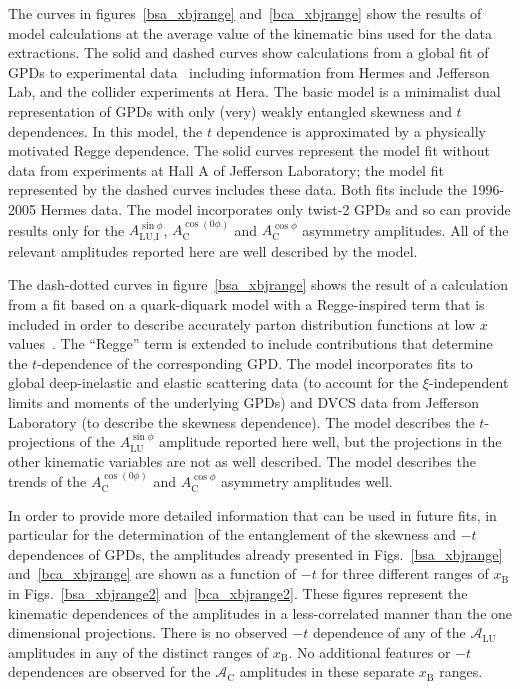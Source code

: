 The curves in  figures~\ref{bsa_xbjrange} and~\ref{bca_xbjrange} show the results of model calculations at the average value of the kinematic bins used for the data extractions. The solid and dashed curves show calculations from a global fit of GPDs to experimental data~\cite{Kum09} including information from H{\sc ermes} and Jefferson Lab, and the collider experiments at H{\sc era}. The basic model is a minimalist dual representation of GPDs with only (very) weakly entangled skewness and $t$ dependences. In this model, the $t$ dependence is approximated by a physically motivated Regge dependence. The solid curves represent the model fit without data from experiments \cite{Cam06, Gir08} at Hall A of Jefferson Laboratory; the model fit represented by the dashed curves includes these data. Both fits include the 1996-2005 H{\sc ermes} data. The model incorporates only twist-2 GPDs and so can provide results only for the $A_{\textrm{LU,I}}^{\sin\phi}$, $A_{\textrm{C}}^{\cos(0\phi)}$ and $A_{\textrm{C}}^{\cos\phi}$ asymmetry amplitudes. All of the relevant amplitudes reported here are well described by the model.

The dash-dotted curves in figure~\ref{bsa_xbjrange} shows the result of a calculation from a fit based on a quark-diquark model with a Regge-inspired term that is included in order to describe accurately parton distribution functions at low $x$ values~\cite{Liu11}. The ``Regge'' term is extended to include contributions that determine the $t$-dependence of the corresponding GPD. The model incorporates fits to global deep-inelastic and elastic scattering data (to account for the $\xi$-independent limits and moments of the underlying GPDs) and DVCS data from Jefferson Laboratory (to describe the skewness dependence). The model describes the $t$-projections of the $A^{\sin\phi}_{\textrm{LU}}$ amplitude reported here well, but the projections in the other kinematic variables are not as well described. The model describes the trends of the $A_{\textrm{C}}^{\cos(0\phi)}$ and $A_{\textrm{C}}^{\cos\phi}$ asymmetry amplitudes well.

In order to provide more detailed information that can be used in future fits, in particular for the determination of the entanglement of the skewness and $-t$ dependences of GPDs, the amplitudes already presented in Figs.~\ref{bsa_xbjrange} and~\ref{bca_xbjrange} are shown as a function of $-t$ for three different ranges of $x_{\textrm{B}}$ in Figs.~\ref{bsa_xbjrange2} and~\ref{bca_xbjrange2}. These figures represent the kinematic dependences of the amplitudes in a less-correlated manner than the one dimensional projections. There is no observed $-t$ dependence of any of the $\mathcal{A}_{\textrm{LU}}$ amplitudes in any of the distinct ranges of $x_{\textrm{B}}$. No additional features or $-t$ dependences are observed for the $\mathcal{A}_{\textrm{C}}$ amplitudes in these separate $x_{\textrm{B}}$ ranges.

